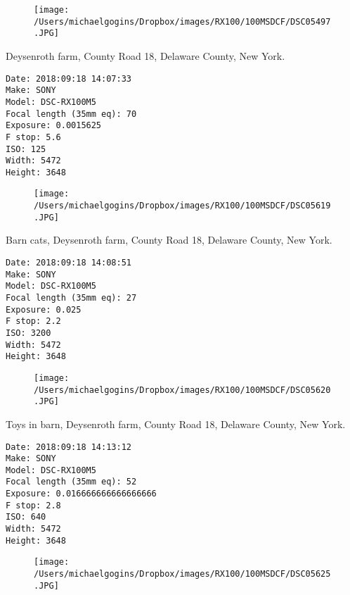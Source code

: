 \documentclass[11pt,letter,DIV=14,paper=landscape]{scrbook}
\begin{document}
\begin{figure}
\texttt{[image: /Users/michaelgogins/Dropbox/images/RX100/100MSDCF/DSC05497.JPG]}
\end{figure}
    
\clearpage
\noindent Deysenroth farm, County Road 18, Delaware County, New York.
\noindent
\begin{lstlisting}
Date: 2018:09:18 14:07:33
Make: SONY
Model: DSC-RX100M5
Focal length (35mm eq): 70
Exposure: 0.0015625
F stop: 5.6
ISO: 125
Width: 5472
Height: 3648
\end{lstlisting}
\clearpage

\begin{figure}
\texttt{[image: /Users/michaelgogins/Dropbox/images/RX100/100MSDCF/DSC05619.JPG]}
\end{figure}
    
\clearpage
\noindent Barn cats, Deysenroth farm, County Road 18, Delaware County, New York.
\noindent
\begin{lstlisting}
Date: 2018:09:18 14:08:51
Make: SONY
Model: DSC-RX100M5
Focal length (35mm eq): 27
Exposure: 0.025
F stop: 2.2
ISO: 3200
Width: 5472
Height: 3648
\end{lstlisting}
\clearpage

\begin{figure}
\texttt{[image: /Users/michaelgogins/Dropbox/images/RX100/100MSDCF/DSC05620.JPG]}
\end{figure}
    
\clearpage
\noindent Toys in barn, Deysenroth farm, County Road 18, Delaware County, New York.
\noindent
\begin{lstlisting}
Date: 2018:09:18 14:13:12
Make: SONY
Model: DSC-RX100M5
Focal length (35mm eq): 52
Exposure: 0.016666666666666666
F stop: 2.8
ISO: 640
Width: 5472
Height: 3648
\end{lstlisting}
\clearpage

\begin{figure}
\texttt{[image: /Users/michaelgogins/Dropbox/images/RX100/100MSDCF/DSC05625.JPG]}
\end{figure}
    
\end{document}
